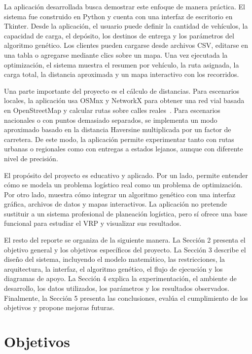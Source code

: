 \documentclass[runningheads]{llncs}
\begin{document}
La aplicaci\'on desarrollada busca demostrar este enfoque de manera pr\'actica.
El sistema fue construido en Python y cuenta con una interfaz de escritorio en
Tkinter. Desde la aplicaci\'on, el usuario puede definir la cantidad de veh\'iculos,
la capacidad de carga, el dep\'osito, los destinos de entrega y los par\'ametros
del algoritmo gen\'etico. Los clientes pueden cargarse desde archivos CSV,
editarse en una tabla o agregarse mediante clics sobre un mapa. Una vez
ejecutada la optimizaci\'on, el sistema muestra el resumen por veh\'iculo, la ruta
asignada, la carga total, la distancia aproximada y un mapa interactivo con los
recorridos.

Una parte importante del proyecto es el c\'alculo de distancias. Para escenarios
locales, la aplicaci\'on usa OSMnx y NetworkX para obtener una red vial basada en
OpenStreetMap y calcular rutas sobre calles reales~\cite{osmnx,networkx}. Para
escenarios nacionales o con puntos demasiado separados, se implementa un modo
aproximado basado en la distancia Haversine multiplicada por un factor de
carretera. De este modo, la aplicaci\'on permite experimentar tanto con rutas
urbanas o regionales como con entregas a estados lejanos, aunque con diferente
nivel de precisi\'on.

El prop\'osito del proyecto es educativo y aplicado. Por un lado, permite
entender c\'omo se modela un problema log\'istico real como un problema de
optimizaci\'on. Por otro lado, muestra c\'omo integrar un algoritmo gen\'etico con
una interfaz gr\'afica, archivos de datos y mapas interactivos. La aplicaci\'on no
pretende sustituir a un sistema profesional de planeaci\'on log\'istica, pero s\'i
ofrece una base funcional para estudiar el VRP y visualizar sus resultados.

El resto del reporte se organiza de la siguiente manera. La Secci\'on 2 presenta
el objetivo general y los objetivos espec\'ificos del proyecto. La Secci\'on 3
describe el dise\~no del sistema, incluyendo el modelo matem\'atico, las
restricciones, la arquitectura, la interfaz, el algoritmo gen\'etico, el flujo de
ejecuci\'on y los diagramas de apoyo. La Secci\'on 4 explica la experimentaci\'on,
el ambiente de desarrollo, los datos utilizados, los par\'ametros y los resultados
observados. Finalmente, la Secci\'on 5 presenta las conclusiones, eval\'ua el
cumplimiento de los objetivos y propone mejoras futuras.

\section{Objetivos}
\end{document}

